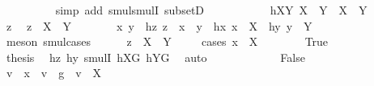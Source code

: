 \begin{isabellebody}
\ \ \ \ \ \ \ \ \isamarkupfalse%
\ {\isacharparenleft}{\kern0pt}simp\ add{\isacharcolon}{\kern0pt}\ smul{\isachardot}{\kern0pt}smulI\ subsetD{\isacharparenright}{\kern0pt}\isanewline
\ \ \ \ \isamarkupfalse%
\isanewline
\ \ \isamarkupfalse%
\isanewline
\ \ \isamarkupfalse%
\ hXY{}{\isacharcolon}{\kern0pt}\ {\isachardoublequoteopen}{\isacharquery}{\kern0pt}X{}\ {\isasymcdots}\ {\isacharquery}{\kern0pt}Y{}\ {\isasymsubseteq}\ X\ {\isasymcdots}\ Y{\isachardoublequoteclose}\isanewline
\ \ \isamarkupfalse%
\isanewline
\ \ \ \ \isamarkupfalse%
\ z\ \isamarkupfalse%
\ {\isachardoublequoteopen}z\ {\isasymin}\ {\isacharquery}{\kern0pt}X{}\ {\isasymcdots}\ {\isacharquery}{\kern0pt}Y{}{\isachardoublequoteclose}\isanewline
\ \ \ \ \isamarkupfalse%
\ \isamarkupfalse%
\ x\ y\ \ hz{\isacharcolon}{\kern0pt}\ {\isachardoublequoteopen}z\ {\isacharequal}{\kern0pt}\ x\ {\isasymcdot}\ y{\isachardoublequoteclose}\ \ hx{\isacharcolon}{\kern0pt}\ {\isachardoublequoteopen}x\ {\isasymin}\ {\isacharquery}{\kern0pt}X{}{\isachardoublequoteclose}\ \ hy{\isacharcolon}{\kern0pt}\ {\isachardoublequoteopen}y\ {\isasymin}\ {\isacharquery}{\kern0pt}Y{}{\isachardoublequoteclose}\ \isamarkupfalse%
\ {\isacharparenleft}{\kern0pt}meson\ smul{\isachardot}{\kern0pt}cases{\isacharparenright}{\kern0pt}\isanewline
\ \ \ \ \isamarkupfalse%
\ {\isachardoublequoteopen}z\ {\isasymin}\ X\ {\isasymcdots}\ Y{\isachardoublequoteclose}\isanewline
\ \ \ \ \isamarkupfalse%
{\isacharparenleft}{\kern0pt}cases\ {\isachardoublequoteopen}x\ {\isasymin}\ X{\isachardoublequoteclose}{\isacharparenright}{\kern0pt}\isanewline
\ \ \ \ \ \ \isamarkupfalse%
\ True\isanewline
\ \ \ \ \ \ \isamarkupfalse%
\ \isamarkupfalse%
\ {\isacharquery}{\kern0pt}thesis\ \isamarkupfalse%
\ hz\ hy\ smulI\ hXG\ hYG\ \isamarkupfalse%
\ auto\isanewline
\ \ \ \ \isamarkupfalse%
\isanewline
\ \ \ \ \ \ \isamarkupfalse%
\ False\isanewline
\ \ \ \ \ \ \isamarkupfalse%
\ \isamarkupfalse%
\ v\ \ {\isachardoublequoteopen}x\ {\isacharequal}{\kern0pt}\ v\ {\isasymcdot}\ g{\isachardoublequoteclose}\ \ {\isachardoublequoteopen}v\ {\isasymin}\ X{\isachardoublequoteclose}\ \isamarkupfalse%

\end{isabellebody}
